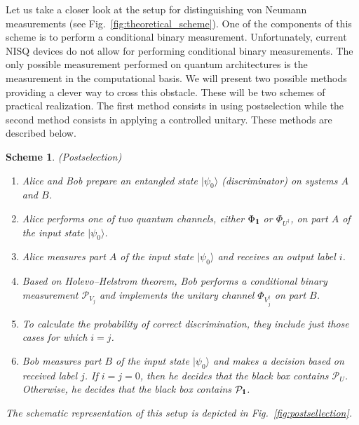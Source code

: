 \documentclass[preprint,12pt, a4paper]{elsarticle}
\newcommand{\ket}[1]{\ensuremath{|#1\rangle}}
\newcommand{\1}{{\rm 1\hspace{-0.9mm}l}}
\newcommand{\Id}{{\rm 1\hspace{-0.9mm}l}}
\newcommand{\PP}{\mathcal{P}}
\newtheorem{scheme}{Scheme}
\begin{document}
Let us take a closer look at the setup for distinguishing von Neumann 
measurements (see Fig.~\ref{fig:theoretical_scheme}). One of the components of 
this scheme is to perform a conditional binary measurement. 
Unfortunately, current NISQ devices do not allow for performing conditional 
binary measurements.
The only possible measurement performed on quantum architectures is the 
measurement in the computational basis. 
We  will present two possible methods providing a clever way to cross this 
obstacle. These will be two schemes of practical realization. 
The first method consists in using postselection while the second method 
consists in applying a controlled unitary. These methods are described below. 

\begin{scheme}(Postselection)









\begin{enumerate}
\item Alice and Bob prepare an entangled state $\ket{\psi_{0}}$ (discriminator) on systems 
$A$ and $B$.
\item Alice performs one of two quantum channels, either $\Phi_{\Id}$ or 
$\Phi_{U^\dagger}$,  on part $A$ of the input state  $\ket{\psi_{0}}$.
\item Alice measures part $A$ of the input state  $\ket{\psi_{0}}$ and 
receives an output label $i$.
\item  
Based on Holevo--Helstrom theorem, Bob performs a conditional binary 
measurement	$\PP_{V_j}$ and implements the unitary channel 	$\Phi_{V_j^\dagger}$ on part $B$.
\item To calculate the probability of correct discrimination, they include just those cases for which $i = j$.
\item Bob measures part $B$ of the input state  $\ket{\psi_{0}}$ and makes a
decision based on received label $j$. If $i=j=0$, then he decides that the 
black box contains $\PP_U$. Otherwise, he decides that the black box contains
$\PP_{\Id}$.
\end{enumerate}


The schematic representation of this setup is depicted in 
Fig.~\ref{fig:postsellection}.     


\end{scheme}
\end{document}
